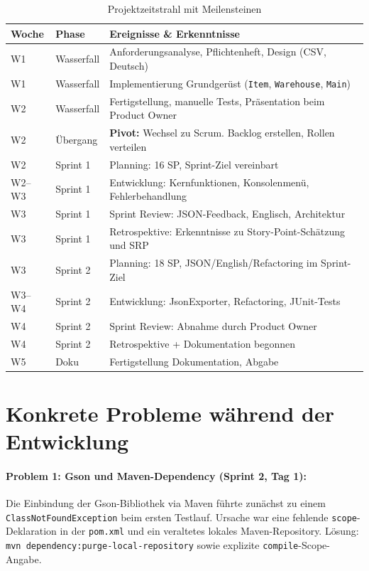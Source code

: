 \documentclass[12pt, a4paper, twoside]{report}
\begin{document}
{\begin{table}[H]
  \centering
  \caption{Projektzeitstrahl mit Meilensteinen}
  \label{tab:zeitstrahl}
  \begin{tabularx}{\textwidth}{C{1.5cm} L{3cm} L{8cm}}
    \toprule
    \textbf{Woche} & \textbf{Phase} & \textbf{Ereignisse \& Erkenntnisse} \\
    \midrule
    W1 & Wasserfall & Anforderungsanalyse, Pflichtenheft, Design (CSV, Deutsch) \\
    W1 & Wasserfall & Implementierung Grundgerüst (\texttt{Item}, \texttt{Warehouse}, \texttt{Main}) \\
    W2 & Wasserfall & Fertigstellung, manuelle Tests, Präsentation beim Product Owner \\
    W2 & Übergang & \textbf{Pivot:} Wechsel zu Scrum. Backlog erstellen, Rollen verteilen \\
    W2 & Sprint 1 & Planning: 16 SP, Sprint-Ziel vereinbart \\
    W2--W3 & Sprint 1 & Entwicklung: Kernfunktionen, Konsolenmenü, Fehlerbehandlung \\
    W3 & Sprint 1 & Sprint Review: JSON-Feedback, Englisch, Architektur \\
    W3 & Sprint 1 & Retrospektive: Erkenntnisse zu Story-Point-Schätzung und SRP \\
    W3 & Sprint 2 & Planning: 18 SP, JSON/English/Refactoring im Sprint-Ziel \\
    W3--W4 & Sprint 2 & Entwicklung: JsonExporter, Refactoring, JUnit-Tests \\
    W4 & Sprint 2 & Sprint Review: Abnahme durch Product Owner \\
    W4 & Sprint 2 & Retrospektive + Dokumentation begonnen \\
    W5 & Doku & Fertigstellung Dokumentation, Abgabe \\
    \bottomrule
  \end{tabularx}
\end{table}

\section{Konkrete Probleme während der Entwicklung}

\paragraph{Problem 1: Gson und Maven-Dependency (Sprint 2, Tag 1):}
Die Einbindung der Gson-Bibliothek via Maven führte zunächst zu einem
\texttt{ClassNotFoundException} beim ersten Testlauf. Ursache war eine
fehlende \texttt{scope}-Deklaration in der \texttt{pom.xml} und ein veraltetes
lokales Maven-Repository. Lösung: \texttt{mvn dependency:purge-local-repository}
sowie explizite \texttt{compile}-Scope-Angabe.

}
\end{document}
